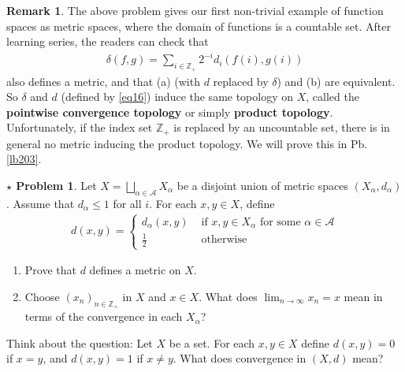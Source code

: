 \documentclass[12pt,b5paper,notitlepage]{article}
\theoremstyle{definition}
\newtheorem{rem}[df]{Remark}
\newtheorem{sprob}[prob]{\color{red}$\star$ Problem}
\theoremstyle{plain}
\newcommand{\scr}{\mathscr}
\newcommand{\Zbb}{\mathbb Z}
\newcommand{\dps}{\displaystyle}
\numberwithin{equation}{section}
\begin{document}
\begin{rem}
The above problem gives our first non-trivial example of function spaces  as metric spaces, where the domain of functions is a countable set. After learning series, the readers can check that 
\begin{align}
\delta(f,g)=\sum_{i\in\Zbb_+}2^{-i} d_i(f(i),g(i))   \label{eq61}
\end{align}
also defines a metric, and that (a) (with $d$ replaced by $\delta$) and (b) are equivalent. So $\delta$ and $d$ (defined by \eqref{eq16}) induce the same topology on $X$, called the \textbf{pointwise convergence topology} or simply \textbf{product topology}. Unfortunately, if the index set $\Zbb_+$ is replaced by an uncountable set, there is in general no metric inducing the product topology. We will prove this in Pb. \ref{lb203}.
\end{rem}













\begin{sprob}\label{lb194}
Let $X=\bigsqcup_{\alpha\in \scr A}X_\alpha$ be a disjoint union of metric spaces $(X_\alpha,d_\alpha)$. Assume that $d_\alpha\leq 1$ for all $i$. For each $x,y\in X$, define
\begin{gather*}
d(x,y)=\left\{
\begin{array}{ll}
d_\alpha(x,y)&\text{ if $x,y\in X_\alpha$ for some $\alpha\in\scr A$}\\[0.5ex]
\frac 12&\text{ otherwise}
\end{array}
\right.
\end{gather*}
\begin{enumerate}
\item Prove that $d$ defines a metric on $X$. 
\item Choose $(x_n)_{n\in\Zbb_+}$ in $X$ and $x\in X$. What does $\dps\lim_{n\rightarrow\infty}x_n=x$ mean in terms of the convergence in each $X_\alpha$?
\end{enumerate}
\end{sprob}

Think about the question: Let $X$ be a set. For each $x,y\in X$ define $d(x,y)=0$ if $x=y$, and $d(x,y)=1$ if $x\neq y$. What does convergence in $(X,d)$ mean?



\newpage
\end{document}
